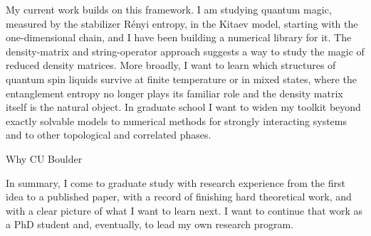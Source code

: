 My current work builds on this framework. I am studying quantum magic, measured by the stabilizer R\'enyi entropy, in the Kitaev model, starting with the one-dimensional chain, and I have been building a numerical library for it. The density-matrix and string-operator approach suggests a way to study the magic of reduced density matrices. More broadly, I want to learn which structures of quantum spin liquids survive at finite temperature or in mixed states, where the entanglement entropy no longer plays its familiar role and the density matrix itself is the natural object. In graduate school I want to widen my toolkit beyond exactly solvable models to numerical methods for strongly interacting systems and to other topological and correlated phases.

{\color{red} Why CU Boulder}

In summary, I come to graduate study with research experience from the first idea to a published paper, with a record of finishing hard theoretical work, and with a clear picture of what I want to learn next. I want to continue that work as a PhD student and, eventually, to lead my own research program.